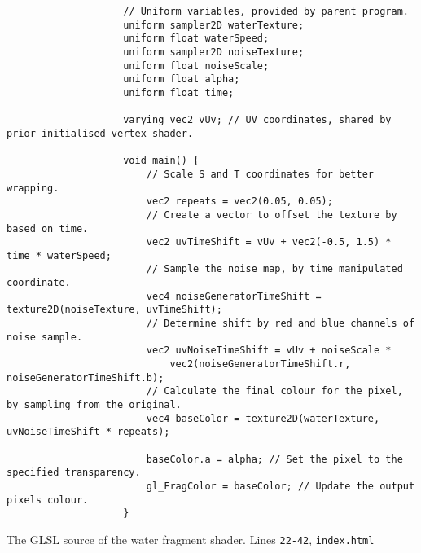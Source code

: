             \begin{listing}[H]
                \begin{verbatim}
                    // Uniform variables, provided by parent program.
                    uniform sampler2D waterTexture;
                    uniform float waterSpeed;
                    uniform sampler2D noiseTexture;
                    uniform float noiseScale;
                    uniform float alpha;
                    uniform float time;

                    varying vec2 vUv; // UV coordinates, shared by prior initialised vertex shader.

                    void main() {
                        // Scale S and T coordinates for better wrapping.
                        vec2 repeats = vec2(0.05, 0.05);
                        // Create a vector to offset the texture by based on time.
                        vec2 uvTimeShift = vUv + vec2(-0.5, 1.5) * time * waterSpeed;
                        // Sample the noise map, by time manipulated coordinate.
                        vec4 noiseGeneratorTimeShift = texture2D(noiseTexture, uvTimeShift);
                        // Determine shift by red and blue channels of noise sample.
                        vec2 uvNoiseTimeShift = vUv + noiseScale *
                            vec2(noiseGeneratorTimeShift.r, noiseGeneratorTimeShift.b);
                        // Calculate the final colour for the pixel, by sampling from the original.
                        vec4 baseColor = texture2D(waterTexture, uvNoiseTimeShift * repeats);

                        baseColor.a = alpha; // Set the pixel to the specified transparency.
                        gl_FragColor = baseColor; // Update the output pixels colour.
                    }

                \end{verbatim}
                \caption{The GLSL source of the water fragment shader. Lines \texttt{22-42}, \texttt{index.html}}
                \label{lst:water_fragment_shader}
            \end{listing}
